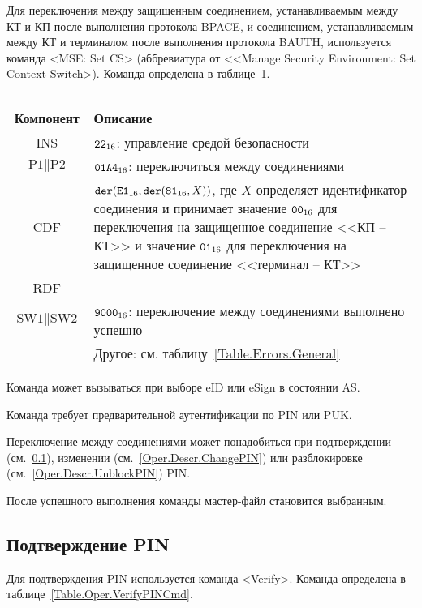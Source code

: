 Для переключения между защищенным соединением,
устанавливаемым между КТ и КП после выполнения 
протокола BPACE, и соединением, 
устанавливаемым между КТ и терминалом после выполнения 
протокола BAUTH, используется команда <MSE: Set CS> (аббревиатура от <<Manage 
Security Environment: Set Context Switch>).
Команда определена в таблице~\ref{Table.Oper.SetCSCmd}.

\begin{table}[hbt]
\caption{}\label{Table.Oper.SetCSCmd}
\begin{tabular}{|c|p{14cm}|}
\hline
Компонент & Описание \\
\hline
\hline
INS & $\texttt{22}_{16}$: управление средой безопасности\\ 
\hline
$\text{P1} \parallel\text{P2}$ & $\texttt{01A4}_{16}$: 
переключиться между соединениями \\
\hline
CDF & 
$\texttt{der}(\texttt{E1}_{16}, \texttt{der}(\texttt{81}_{16}, X))$, 
где $X$ определяет идентификатор
соединения и принимает значение $\texttt{00}_{16}$ для
переключения на защищенное соединение <<КП -- КТ>>
и значение $\texttt{01}_{16}$ для переключения на защищенное
соединение <<терминал -- КТ>>\\ 
\hline 
\hline
RDF &  --- \\
\hline
$\text{SW1} \parallel \text{SW2}$ & 
$\texttt{9000}_{16}$: переключение между соединениями выполнено успешно \\
\cline{2-2}
 & Другое: см. таблицу~\ref{Table.Errors.General} \\
\hline
\end{tabular}
\end{table}

Команда может вызываться при выборе eID или eSign в состоянии AS.

Команда требует предварительной аутентификации по PIN или PUK.

Переключение между соединениями может понадобиться
при подтверждении (см.~\ref{Oper.Descr.VerifyPIN}), 
изменении (см.~\ref{Oper.Descr.ChangePIN})
или разблокировке (см.~\ref{Oper.Descr.UnblockPIN}) PIN.

После успешного выполнения команды мастер-файл становится выбранным. 

\subsection{Подтверждение PIN}
\label{Oper.Descr.VerifyPIN}

Для подтверждения PIN используется команда <Verify>. 
Команда определена в таблице~\ref{Table.Oper.VerifyPINCmd}.


